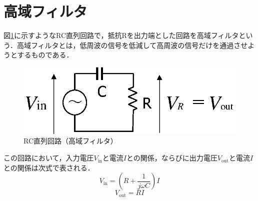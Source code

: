\section{高域フィルタ}

図\ref{fig:hpf}に示すようなRC直列回路で，抵抗Rを出力端とした回路を高域フィルタという．高域フィルタとは，低周波の信号を低減して高周波の信号だけを通過させようとするものである．

\begin{figure}[H]
\begin{center}
\includegraphics[width=.6\textwidth]{fig/hpf1.eps}
\end{center}
\caption{RC直列回路（高域フィルタ）}
\label{fig:hpf}
\end{figure}

この回路において，入力電圧$V_\textrm{in}$と電流$I$との関係，ならびに出力電圧$V_\textrm{out}$と電流$I$との関係は次式で表される．
\begin{equation}
V_\textrm{in}=\left ( R + \frac{1}{j\omega C} \right ) I
\label{eqn:denki-hpf1}
\end{equation}
\begin{equation}
V_\textrm{out}= R  I
\label{eqn:denki-hpf2}
\end{equation}

